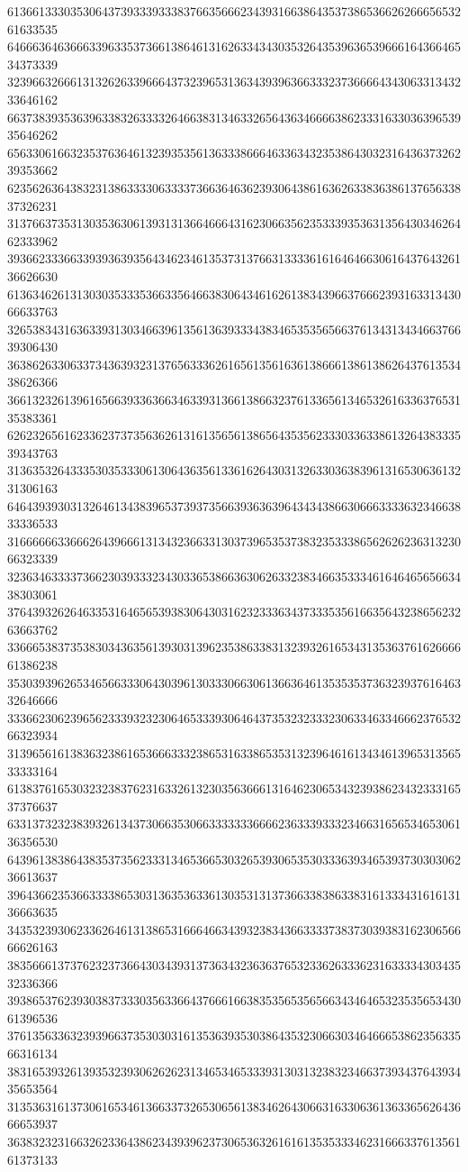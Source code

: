61366133303530643739333933383766356662343931663864353738653662626665653261633535
64666364636663396335373661386461316263343430353264353963653966616436646534373339
32396632666131326263396664373239653136343939636633323736666434306331343233646162
66373839353639633832633332646638313463326564363466663862333163303639653935646262
65633061663235376364613239353561363338666463363432353864303231643637326239353662
62356263643832313863333063333736636463623930643861636263383638613765633837326231
31376637353130353630613931313664666431623066356235333935363135643034626462333962
39366233366339393639356434623461353731376631333361616464663061643764326136626630
61363462613130303533353663356466383064346162613834396637666239316331343066633763
32653834316363393130346639613561363933343834653535656637613431343466376639306430
36386263306337343639323137656333626165613561636138666138613862643761353438626366
36613232613961656639336366346339313661386632376133656134653261633637653135383361
62623265616233623737356362613161356561386564353562333033633861326438333539343763
31363532643335303533306130643635613361626430313263303638396131653063613231306163
64643939303132646134383965373937356639363639643434386630666333363234663833336533
31666666336662643966613134323663313037396535373832353338656262623631323066323339
32363463333736623039333234303365386636306263323834663533346164646565663438303061
37643932626463353164656539383064303162323336343733353561663564323865623263663762
33666538373538303436356139303139623538633831323932616534313536376162666661386238
35303939626534656633306430396130333066306136636461353535373632393761646332646666
33366230623965623339323230646533393064643735323233323063346334666237653266323934
31396561613836323861653666333238653163386535313239646161343461396531356533333164
61383761653032323837623163326132303563666131646230653432393862343233316537376637
63313732323839326134373066353066333333366662363339333234663165653465306136356530
64396138386438353735623331346536653032653930653530333639346539373030306236613637
39643662353663333865303136353633613035313137366338386338316133343161613136663635
34353239306233626461313865316664663439323834366333373837303938316230656666626163
38356661373762323736643034393137363432363637653233626333623163333430343532336366
39386537623930383733303563366437666166383535653565663434646532353565343061396536
37613563363239396637353030316135363935303864353230663034646665386235633566316134
38316539326139353239306262623134653465333931303132383234663739343764393435653564
31353631613730616534613663373265306561383462643066316330636136336562643666653937
36383232316632623364386234393962373065363261616135353334623166633761356161373133
